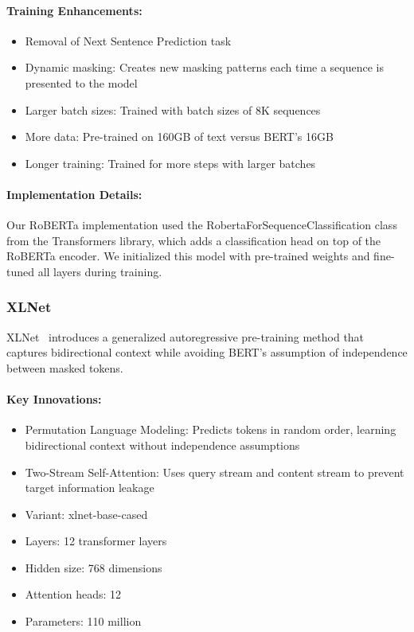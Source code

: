 \documentclass[12pt]{article}
\begin{document}
\paragraph{Training Enhancements:}
\begin{itemize}
    \item Removal of Next Sentence Prediction task
    \item Dynamic masking: Creates new masking patterns each time a sequence is presented to the model
    \item Larger batch sizes: Trained with batch sizes of 8K sequences
    \item More data: Pre-trained on 160GB of text versus BERT's 16GB
    \item Longer training: Trained for more steps with larger batches
\end{itemize}

\paragraph{Implementation Details:}
Our RoBERTa implementation used the RobertaForSequenceClassification class from the Transformers library, which adds a classification head on top of the RoBERTa encoder. We initialized this model with pre-trained weights and fine-tuned all layers during training.

\subsubsection{XLNet}
XLNet~\cite{yang2019xlnet} introduces a generalized autoregressive pre-training method that captures bidirectional context while avoiding BERT's assumption of independence between masked tokens.

\paragraph{Key Innovations:}
\begin{itemize}
    \item Permutation Language Modeling: Predicts tokens in random order, learning bidirectional context without independence assumptions
    \item Two-Stream Self-Attention: Uses query stream and content stream to prevent target information leakage
    \item Variant: xlnet-base-cased
    \item Layers: 12 transformer layers
    \item Hidden size: 768 dimensions
    \item Attention heads: 12
    \item Parameters: 110 million
\end{itemize}
\end{document}
